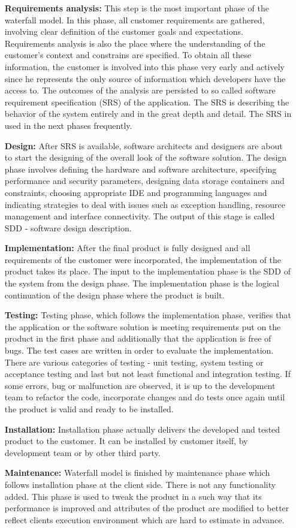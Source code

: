 \documentclass[12pt,final,oneside]{fithesis}
\begin{document}
\begin{itemize}
	\item[\textbf{Requirements analysis:}] This step is the most important phase of the waterfall model. In this phase, all customer requirements are gathered, involving clear definition of the customer goals and expectations. Requirements analysis is also the place where the understanding of the customer's context and constrains are specified. To obtain all these information, the customer is involved into this phase very early and actively since he represents the only source of information which developers have the access to. The outcomes of the analysis are persisted to so called software requirement specification (SRS) of the application. The SRS is describing the behavior of the system entirely and in the great depth and detail. The SRS in used in the next phases frequently.
	\item[\textbf{Design:}] After SRS is available, software architects and designers are about to start the designing of the overall look of the software solution. The design phase involves defining the hardware and software architecture, specifying performance and security parameters, designing data storage containers and constraints, choosing appropriate IDE and programming languages and indicating strategies to deal with issues such as exception handling, resource management and interface connectivity. The output of this stage is called SDD - software design description.
	\item[\textbf{Implementation:}] After the final product is fully designed and all requirements of the customer were incorporated, the implementation of the product takes its place. The input to the implementation phase is the SDD of the system from the design phase. The implementation phase is the logical continuation of the design phase where the product is built.
	\item[\textbf{Testing:}] Testing phase, which follows the implementation phase, verifies that the application or the software solution is meeting requirements put on the product in the first phase and additionally that the application is free of bugs. The test cases are written in order to evaluate the implementation. There are various categories of testing - unit testing, system testing or acceptance testing and last but not least functional and integration testing. If some errors, bug or malfunction are observed, it is up to the development team to refactor the code, incorporate changes and do tests once again until the product is valid and ready to be installed.
	\item[\textbf{Installation:}] Installation phase actually delivers the developed and tested product to the customer. It can be installed by customer itself, by development team or by other third party.
	\item[\textbf{Maintenance:}] Waterfall model is finished by maintenance phase which follows installation phase at the client side. There is not any functionality added. This phase is used to tweak the product in a such way that its performance is improved and attributes of the product are modified to better reflect clients execution environment which are hard to estimate in advance.
\end{itemize}
\end{document}
